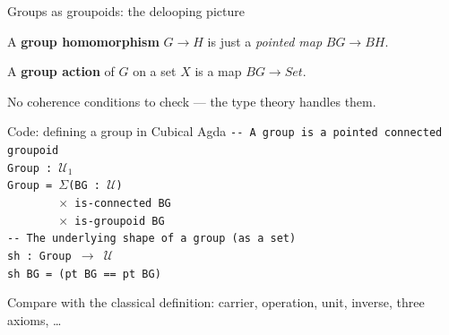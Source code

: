 \documentclass[aspectratio=169,12pt]{beamer}
\newcommand{\BG}{B\!G}
\begin{document}
\begin{frame}{Groups as groupoids: the delooping picture}
  \begin{center}
  \end{center}
  \pause\medskip
  A \textbf{group homomorphism} $G \to H$ is just a \emph{pointed map} $\BG \to B\!H$.

  \pause\medskip
  A \textbf{group action} of $G$ on a set $X$
  is a map $\BG \to Set$.

  \pause\medskip
  No coherence conditions to check --- the type theory handles them.
\end{frame}

\begin{frame}{Code: defining a group in Cubical Agda}
  \texttt{-{}- A group is a pointed connected groupoid}\\
  \texttt{Group : }$\mathcal{U}_1$\\
  \texttt{Group = }$\Sigma$\texttt{(BG : }$\mathcal{U}$\texttt{)}\\
  \texttt{\ \ \ \ \ \ \ \ }$\times$\texttt{\ is-connected BG}\\
  \texttt{\ \ \ \ \ \ \ \ }$\times$\texttt{\ is-groupoid BG}\\[6pt]
  \texttt{-{}- The underlying shape of a group (as a set)}\\
  \texttt{sh : Group }$\to$\texttt{ }$\mathcal{U}$\\
  \texttt{sh BG = (pt BG == pt BG)}
  \pause\medskip

  Compare with the classical definition: carrier, operation, unit,
  inverse, three axioms, \ldots
\end{frame}
\end{document}

